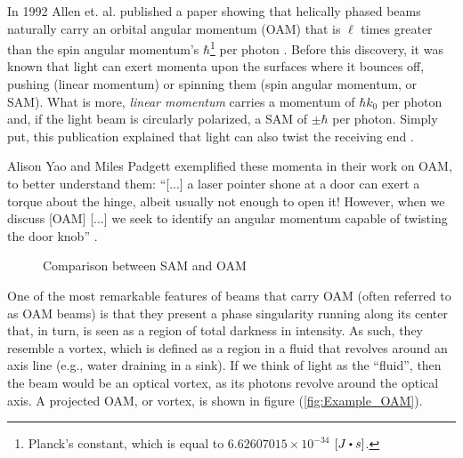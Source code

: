 In 1992 Allen et. al. published a paper showing that helically phased beams naturally carry an orbital angular momentum (OAM) that is $\ell$ times greater than the spin angular momentum's $\hbar$\footnote{Planck's constant, which is equal to $6.62607015\times 10^{-34}$ $[J\bigcdot s]$.} per photon \cite{Allen_OAM:1992}. Before this discovery, it was known that light can exert momenta upon the surfaces where it bounces off, pushing (linear momentum) or spinning them (spin angular momentum, or SAM). What is more, \textit{linear momentum} carries a momentum of $\hbar k_0$ per photon and, if the light beam is circularly polarized, a SAM of $\pm \hbar$ per photon. Simply put, this publication explained that light can also twist the receiving end \cite{Yao-Padgett:2011}.

Alison Yao and Miles Padgett exemplified these momenta in their work on OAM, to better understand them: ``[...] a laser pointer shone at a door can exert a torque about the hinge, albeit usually not enough to open it! However, when we discuss [OAM] [...] we seek to identify an angular momentum capable of twisting the door knob'' \cite{Yao-Padgett:2011-door_example}.

\begin{figure}[htbp]
    \centering
    \caption{Comparison between SAM and OAM \cite{Wikimedia:SAM_vs_OAM}}
    \label{fig:SAM_vs_OAM}
\end{figure}

One of the most remarkable features of beams that carry OAM (often referred to as OAM beams) is that they present a phase singularity running along its center that, in turn, is seen as a region of total darkness in intensity. As such, they resemble a vortex, which is defined as a region in a fluid that revolves around an axis line (e.g., water draining in a sink). If we think of light as the ``fluid'', then the beam would be an optical vortex, as its photons revolve around the optical axis. A projected OAM, or vortex, is shown in figure (\ref{fig:Example_OAM}).

